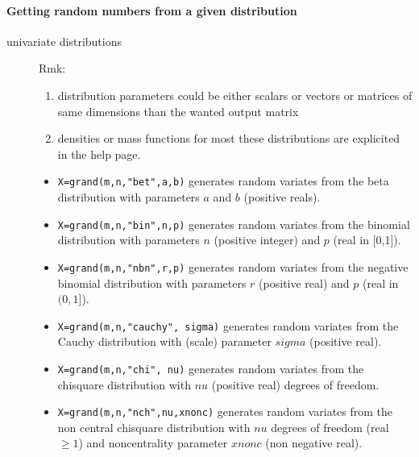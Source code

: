 \paragraph{Getting random numbers from a given distribution}

\begin{description}
\item[univariate distributions] Rmk: 
\begin{enumerate}
\item distribution parameters could be either scalars or vectors or
  matrices of same dimensions than the wanted output matrix
\item densities or mass functions for most these distributions are
  explicited in the  help page.
\end{enumerate}

\begin{itemize}
\item {} \verb!X=grand(m,n,"bet",a,b)! generates random variates from 
  the beta distribution with parameters $a$ and $b$ (positive reals).

\item {} 
  \verb!X=grand(m,n,"bin",n,p)!  generates random variates from the binomial 
  distribution with parameters $n$ (positive integer) and $p$
  (real in [0,1]).

\item {} 
  \verb!X=grand(m,n,"nbn",r,p)! generates random variates from the negative binomial 
  distribution with parameters $r$ (positive real) and $p$ (real 
  in $(0,1]$).
  
\item {} 
  \verb!X=grand(m,n,"cauchy", sigma)! generates random variates from the Cauchy distribution 
  with (scale) parameter $sigma$ (positive real).
  
\item {} 
  \verb!X=grand(m,n,"chi", nu)! generates random variates from the chisquare distribution 
  with $nu$ (positive real) degrees of freedom. 
  
\item {} 
  \verb!X=grand(m,n,"nch",nu,xnonc)! generates random variates from the non central chisquare
  distribution with $nu$ degrees of freedom (real $\ge 1$) and
  noncentrality parameter $xnonc$ (non negative real).
  

\end{itemize}
\end{description}
